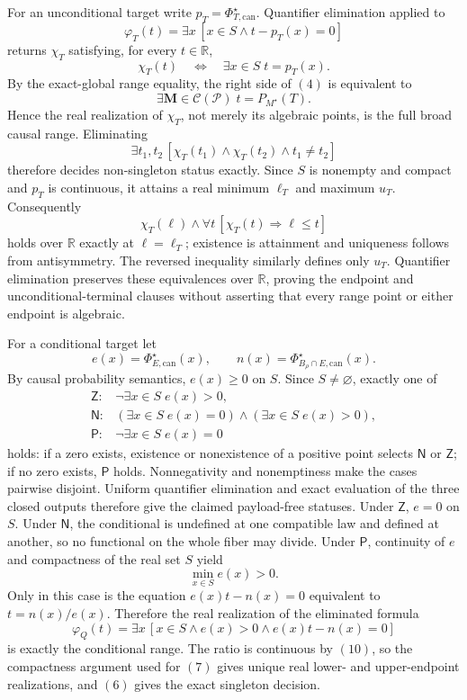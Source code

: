 For an unconditional target write \(p_T=\Phi_{T,\mathrm{can}}^\star\).  Quantifier elimination applied to
\[
\varphi_T(t)=\exists x\,[x\in S\wedge t-p_T(x)=0]
\tag{3}
\]
returns \(\chi_T\) satisfying, for every \(t\in\mathbb R\),
\[
\chi_T(t)\quad\Longleftrightarrow\quad
\exists x\in S\;t=p_T(x).
\tag{4}
\]
By the exact-global range equality, the right side of \((4)\) is equivalent to
\[
\exists\mathbf M\in\mathcal C(\mathcal P)\;
t=P_{M^\star}(T).
\tag{5}
\]
Hence the real realization of \(\chi_T\), not merely its algebraic points, is the full broad causal range.  Eliminating
\[
\exists t_1,t_2\,[\chi_T(t_1)\wedge\chi_T(t_2)\wedge t_1\ne t_2]
\tag{6}
\]
therefore decides non-singleton status exactly.  Since \(S\) is nonempty and compact and \(p_T\) is continuous, it attains a real minimum \(\ell_T\) and maximum \(u_T\).  Consequently
\[
\chi_T(\ell)\wedge\forall t\,[\chi_T(t)\Longrightarrow\ell\leq t]
\tag{7}
\]
holds over \(\mathbb R\) exactly at \(\ell=\ell_T\); existence is attainment and uniqueness follows from antisymmetry.  The reversed inequality similarly defines only \(u_T\).  Quantifier elimination preserves these equivalences over \(\mathbb R\), proving the endpoint and unconditional-terminal clauses without asserting that every range point or either endpoint is algebraic.

For a conditional target let
\[
e(x)=\Phi_{E,\mathrm{can}}^\star(x),
\qquad
n(x)=\Phi_{B_\rho\cap E,\mathrm{can}}^\star(x).
\tag{8}
\]
By causal probability semantics, \(e(x)\geq0\) on \(S\).  Since \(S\ne\varnothing\), exactly one of
\[
\begin{array}{ll}
\mathsf Z:&\neg\exists x\in S\;e(x)>0,\\
\mathsf N:&(\exists x\in S\;e(x)=0)\wedge(\exists x\in S\;e(x)>0),\\
\mathsf P:&\neg\exists x\in S\;e(x)=0
\end{array}
\tag{9}
\]
holds: if a zero exists, existence or nonexistence of a positive point selects \(\mathsf N\) or \(\mathsf Z\); if no zero exists, \(\mathsf P\) holds.  Nonnegativity and nonemptiness make the cases pairwise disjoint.  Uniform quantifier elimination and exact evaluation of the three closed outputs therefore give the claimed payload-free statuses.  Under \(\mathsf Z\), \(e=0\) on \(S\).  Under \(\mathsf N\), the conditional is undefined at one compatible law and defined at another, so no functional on the whole fiber may divide.  Under \(\mathsf P\), continuity of \(e\) and compactness of the real set \(S\) yield
\[
\min_{x\in S}e(x)>0.
\tag{10}
\]
Only in this case is the equation \(e(x)t-n(x)=0\) equivalent to \(t=n(x)/e(x)\).  Therefore the real realization of the eliminated formula
\[
\varphi_Q(t)=\exists x\,[x\in S\wedge e(x)>0\wedge e(x)t-n(x)=0]
\tag{11}
\]
is exactly the conditional range.  The ratio is continuous by \((10)\), so the compactness argument used for \((7)\) gives unique real lower- and upper-endpoint realizations, and \((6)\) gives the exact singleton decision.

